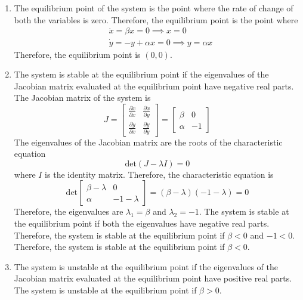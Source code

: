\begin{enumerate}[noitemsep]
    \item The equilibrium point of the system is the point where the rate of change of both the variables is zero. Therefore, the equilibrium point is the point where
          \begin{align*}
               & \dot{x}=\beta x=0 \implies x=0            \\
               & \dot{y}=-y+\alpha x=0 \implies y=\alpha x
          \end{align*}
          Therefore, the equilibrium point is \( (0,0) \).
    \item The system is stable at the equilibrium point if the eigenvalues of the Jacobian matrix evaluated at the equilibrium point have negative real parts. The Jacobian matrix of the system is
          \[
              J=\begin{bmatrix}
                  \frac{\partial \dot{x}}{\partial x} & \frac{\partial \dot{x}}{\partial y} \\
                  \frac{\partial \dot{y}}{\partial x} & \frac{\partial \dot{y}}{\partial y}
              \end{bmatrix}
              =\begin{bmatrix}
                  \beta  & 0  \\
                  \alpha & -1
              \end{bmatrix}
          \]
          The eigenvalues of the Jacobian matrix are the roots of the characteristic equation
          \[
              \text{det}(J-\lambda I)=0
          \]
          where \( I \) is the identity matrix. Therefore, the characteristic equation is
          \[
              \text{det}\begin{bmatrix}
                  \beta-\lambda & 0          \\
                  \alpha        & -1-\lambda
              \end{bmatrix}
              =(\beta-\lambda)(-1-\lambda)=0
          \]
          Therefore, the eigenvalues are \( \lambda_1=\beta \) and \( \lambda_2=-1 \). The system is stable at the equilibrium point if both the eigenvalues have negative real parts. Therefore, the system is stable at the equilibrium point if \( \beta<0 \) and \( -1<0 \). Therefore, the system is stable at the equilibrium point if \( \beta<0 \).
    \item The system is unstable at the equilibrium point if the eigenvalues of the Jacobian matrix evaluated at the equilibrium point have positive real parts. The system is unstable at the equilibrium point if \( \beta
          >0 \).
\end{enumerate}
